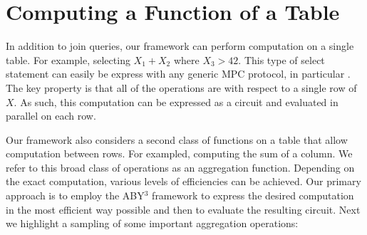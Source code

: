 \section{Computing a Function of a Table}\label{sec:card}

In addition to join queries, our framework can perform computation on a single table. For example, selecting $X_1+X_2$  where $X_3>42$. This type of select statement can easily be express with any generic MPC protocol, in particular \cite{aby3, highthroughput}. The key property is that all of the operations are with respect to a single row of $X$. As such, this computation can be expressed as a circuit and evaluated in parallel on each row. 

Our framework also considers a second class of functions on a table that allow computation between rows. For exampled, computing the sum of a column. We refer to this broad class of operations as an aggregation function. Depending on the exact computation, various levels of efficiencies can be achieved. Our primary approach is to employ the ABY$^3$ framework \cite{aby3} to express the desired computation in the most efficient way possible and then to evaluate the resulting circuit. Next we highlight a sampling of some important aggregation operations:

